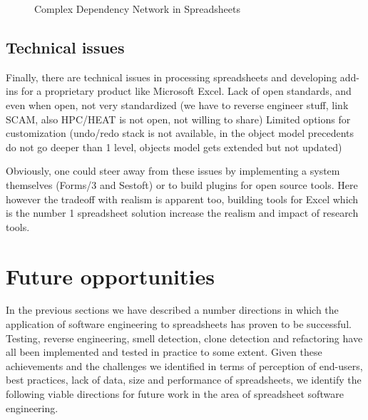 \documentclass[conference]{IEEEtran}
\begin{document}
\begin{figure}
	\centering
	\setlength{\fboxsep}{0pt}
	\setlength{\fboxrule}{1pt}
	\caption{Complex Dependency Network in Spreadsheets}
	\label{fig:ComplexDependence}
\end{figure}



\subsection{Technical issues} 
Finally, there are technical issues in processing spreadsheets and developing add-ins for a proprietary product like Microsoft Excel. 
Lack of open standards, and even when open, not very standardized (we have to reverse engineer stuff, link SCAM, also HPC/HEAT is not open, not willing to share)
Limited options for customization (undo/redo stack is not available, in the object model precedents do not go deeper than 1 level, objects model gets extended but not updated)

Obviously, one could steer away from these issues by implementing a system themselves (Forms/3 and Sestoft) or to build plugins for open source tools. Here however the tradeoff with realism is apparent too, building tools for Excel which is the number 1 spreadsheet solution increase the realism and impact of research tools.

\section{Future opportunities}
In the previous sections we have described a number directions in which the application of software engineering to spreadsheets  has proven to be successful. Testing, reverse engineering, smell detection, clone detection and refactoring have all been implemented and tested in practice to some extent. Given these achievements and the challenges we identified in terms of perception of end-users, best practices, lack of data, size and performance of spreadsheets, we identify the following viable directions for future work in the area of spreadsheet software engineering.
\end{document}
